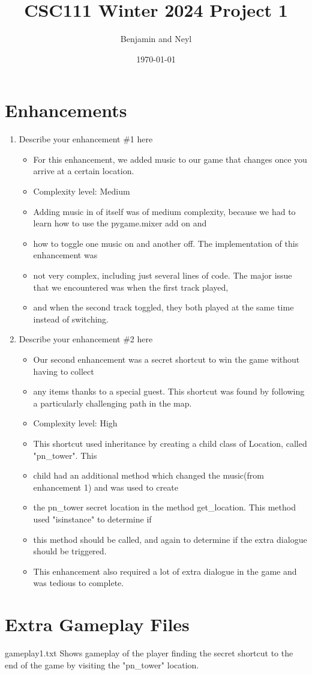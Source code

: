\documentclass[11pt]{article}
\title{CSC111 Winter 2024 Project 1}
\author{Benjamin and Neyl}
\date{\today}
\begin{document}
\maketitle

\section*{Enhancements}


\begin{enumerate}

\item Describe your enhancement \#1 here
	\begin{itemize}
	\item For this enhancement, we added music to our game that changes once you arrive at a certain location.
	\item Complexity level: Medium
	\item Adding music in of itself was of medium complexity, because we had to learn how to use the pygame.mixer add on and
	\item how to toggle one music on and another off. The implementation of this enhancement was
	\item not very complex, including just several lines of code. The major issue that we encountered was when the first track played,
	\item and when the second track toggled, they both played at the same time instead of switching.

	\end{itemize}

\item Describe your enhancement \#2 here
	\begin{itemize}
	\item Our second enhancement was a secret shortcut to win the game without having to collect
	\item any items thanks to a special guest. This shortcut was found by following a particularly challenging path in the map.
	\item Complexity level: High
	\item This shortcut used inheritance by creating a child class of Location, called "pn_tower". This
	\item child had an additional method which changed the music(from enhancement 1) and was used to create
	\item the pn_tower secret location in the method get_location. This method used "isinstance" to determine if
	\item this method should be called, and again to determine if the extra dialogue should be triggered.
	\item This enhancement also required a lot of extra dialogue in the game and was tedious to complete.

	\end{itemize}

\end{enumerate}


\section*{Extra Gameplay Files}

gameplay1.txt
Shows gameplay of the player finding the secret shortcut to the end of the game by visiting the "pn_tower" location.
\end{document}
